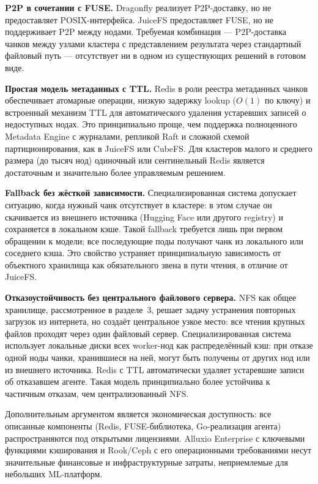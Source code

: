 \textbf{P2P в сочетании с FUSE.} Dragonfly реализует P2P-доставку, но не предоставляет POSIX-интерфейса. JuiceFS предоставляет FUSE, но не поддерживает P2P между нодами. Требуемая комбинация --- P2P-доставка чанков между узлами кластера с представлением результата через стандартный файловый путь --- отсутствует ни в одном из существующих решений в готовом виде.

\textbf{Простая модель метаданных с TTL.} Redis в роли реестра метаданных чанков обеспечивает атомарные операции, низкую задержку lookup ($O(1)$ по ключу) и встроенный механизм TTL для автоматического удаления устаревших записей о недоступных нодах. Это принципиально проще, чем поддержка полноценного Metadata Engine с журналами, репликой Raft и сложной схемой партиционирования, как в JuiceFS или CubeFS. Для кластеров малого и среднего размера (до тысяч нод) одиночный или сентинельный Redis является достаточным и значительно более управляемым решением.

\textbf{Fallback без жёсткой зависимости.} Специализированная система допускает ситуацию, когда нужный чанк отсутствует в кластере: в этом случае он скачивается из внешнего источника (Hugging Face или другого registry) и сохраняется в локальном кэше. Такой fallback требуется лишь при первом обращении к модели; все последующие поды получают чанк из локального или соседнего кэша. Это свойство устраняет принципиальную зависимость от объектного хранилища как обязательного звена в пути чтения, в отличие от JuiceFS.

\textbf{Отказоустойчивость без центрального файлового сервера.} NFS как общее хранилище, рассмотренное в разделе~3, решает задачу устранения повторных загрузок из интернета, но создаёт центральное узкое место: все чтения крупных файлов проходят через один файловый сервер. Специализированная система использует локальные диски всех worker-нод как распределённый кэш: при отказе одной ноды чанки, хранившиеся на ней, могут быть получены от других нод или из внешнего источника. Redis с TTL автоматически удаляет устаревшие записи об отказавшем агенте. Такая модель принципиально более устойчива к частичным отказам, чем централизованный NFS.

Дополнительным аргументом является экономическая доступность: все описанные компоненты (Redis, FUSE-библиотека, Go-реализация агента) распространяются под открытыми лицензиями. Alluxio Enterprise с ключевыми функциями кэширования и Rook/Ceph с его операционными требованиями несут значительные финансовые и инфраструктурные затраты, неприемлемые для небольших ML-платформ.

